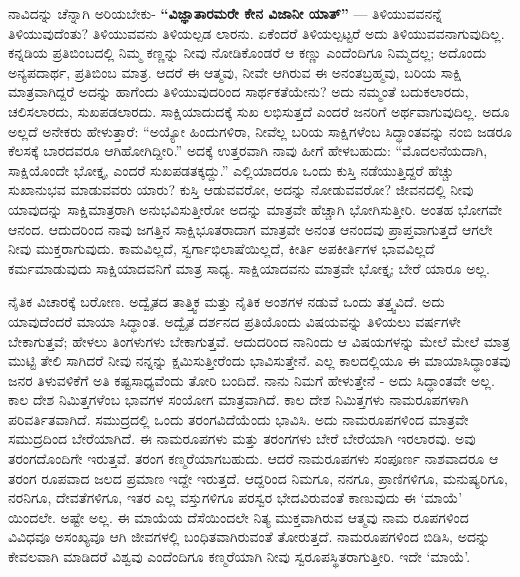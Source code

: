 ನಾವಿದನ್ನು ಚೆನ್ನಾಗಿ ಅರಿಯಬೇಕು- \textbf{“ವಿಜ್ಞಾತಾರಮರೇ ಕೇನ ವಿಜಾನೀ ಯಾತ್​”} — ತಿಳಿಯುವವನನ್ನೆ ತಿಳಿಯುವುದೆಂತು? ತಿಳಿಯುವವನು ತಿಳಿಯಲ್ಪಡ ಲಾರನು. ಏಕೆಂದರೆ ತಿಳಿಯಲ್ಪಟ್ಟರೆ ಅದು ತಿಳಿಯುವವನಾಗುವುದಿಲ್ಲ. ಕನ್ನಡಿಯ ಪ್ರತಿಬಿಂಬದಲ್ಲಿ ನಿಮ್ಮ ಕಣ್ಣನ್ನು ನೀವು ನೋಡಿಕೊಂಡರೆ ಆ ಕಣ್ಣು ಎಂದೆಂದಿಗೂ ನಿಮ್ಮದಲ್ಲ; ಅದೊಂದು ಅನ್ಯಪದಾರ್ಥ, ಪ್ರತಿಬಿಂಬ ಮಾತ್ರ. ಆದರೆ ಈ ಆತ್ಮವು, ನೀವೇ ಆಗಿರುವ ಈ ಅನಂತಬ್ರಹ್ಮವು, ಬರಿಯ ಸಾಕ್ಷಿ ಮಾತ್ರವಾಗಿದ್ದರೆ ಅದನ್ನು ಹಾಗೆಂದು ತಿಳಿಯುವುದರಿಂದ ಸಾರ್ಥಕತೆಯೇನು? ಅದು ನಮ್ಮಂತೆ ಬದುಕಲಾರದು, ಚಲಿಸಲಾರದು, ಸುಖಪಡಲಾರದು. ಸಾಕ್ಷಿಯಾದುದಕ್ಕೆ ಸುಖ ಲಭಿಸುತ್ತದೆ ಎಂದರೆ ಜನರಿಗೆ ಅರ್ಥವಾಗುವುದಿಲ್ಲ. ಅದೂ ಅಲ್ಲದೆ ಅನೇಕರು ಹೇಳುತ್ತಾರೆ: “ಅಯ್ಯೋ ಹಿಂದುಗಳಿರಾ, ನೀವೆಲ್ಲ ಬರಿಯ ಸಾಕ್ಷಿಗಳೆಂಬ ಸಿದ್ಧಾಂತವನ್ನು ನಂಬಿ ಜಡರೂ ಕೆಲಸಕ್ಕೆ ಬಾರದವರೂ ಆಗಿಹೋಗಿದ್ದೀರಿ.” ಅದಕ್ಕೆ ಉತ್ತರವಾಗಿ ನಾವು ಹೀಗೆ ಹೇಳಬಹುದು: “ಮೊದಲನೆಯದಾಗಿ, ಸಾಕ್ಷಿಯೊಂದೇ ಭೋಕ್ತೃ, ಎಂದರೆ ಸುಖಪಡತಕ್ಕದ್ದು.” ಎಲ್ಲಿಯಾದರೂ ಒಂದು ಕುಸ್ತಿ ನಡೆಯುತ್ತಿದ್ದರೆ ಹೆಚ್ಚು ಸುಖಾನುಭವ ಮಾಡುವವರು ಯಾರು? ಕುಸ್ತಿ ಆಡುವವರೋ, ಅದನ್ನು ನೋಡುವವರೋ? ಜೀವನದಲ್ಲಿ ನೀವು ಯಾವುದನ್ನು ಸಾಕ್ಷಿಮಾತ್ರರಾಗಿ ಅನುಭವಿಸುತ್ತೀರೋ ಅದನ್ನು ಮಾತ್ರವೇ ಹೆಚ್ಚಾಗಿ ಭೋಗಿಸುತ್ತೀರಿ. ಅಂತಹ ಭೋಗವೇ ಆನಂದ. ಆದುದರಿಂದ ನಾವು ಜಗತ್ತಿನ ಸಾಕ್ಷಿಭೂತರಾದಾಗ ಮಾತ್ರವೇ ಅನಂತ ಆನಂದವು ಪ್ರಾಪ್ತವಾಗುತ್ತದೆ ಆಗಲೇ ನೀವು ಮುಕ್ತರಾಗುವುದು. ಕಾಮವಿಲ್ಲದೆ, ಸ್ವರ್ಗಾಭಿಲಾಷೆಯಿಲ್ಲದೆ, ಕೀರ್ತಿ ಅಪಕೀರ್ತಿಗಳ ಭಾವವಿಲ್ಲದೆ ಕರ್ಮಮಾಡುವುದು ಸಾಕ್ಷಿಯಾದವನಿಗೆ ಮಾತ್ರ ಸಾಧ್ಯ. ಸಾಕ್ಷಿಯಾದವನು ಮಾತ್ರವೇ ಭೋಕ್ತೃ; ಬೇರೆ ಯಾರೂ ಅಲ್ಲ.

ನೈತಿಕ ವಿಚಾರಕ್ಕೆ ಬರೋಣ. ಅದ್ವೈತದ ತಾತ್ತ್ವಿಕ ಮತ್ತು ನೈತಿಕ ಅಂಶಗಳ ನಡುವೆ ಒಂದು ತತ್ತ್ವವಿದೆ. ಅದು ಯಾವುದೆಂದರೆ ಮಾಯಾ ಸಿದ್ಧಾಂತ. ಅದ್ವೈತ ದರ್ಶನದ ಪ್ರತಿಯೊಂದು ವಿಷಯವನ್ನು ತಿಳಿಯಲು ವರ್ಷಗಳೇ ಬೇಕಾಗುತ್ತವೆ; ಹೇಳಲು ತಿಂಗಳುಗಳು ಬೇಕಾಗುತ್ತವೆ. ಆದುದರಿಂದ ನಾನಿಂದು ಆ ವಿಷಯಗಳನ್ನು ಮೇಲೆ ಮೇಲೆ ಮಾತ್ರ ಮುಟ್ಟಿ ತೇಲಿ ಸಾಗಿದರೆ ನೀವು ನನ್ನನ್ನು ಕ್ಷಮಿಸುತ್ತೀರೆಂದು ಭಾವಿಸುತ್ತೇನೆ. ಎಲ್ಲ ಕಾಲದಲ್ಲಿಯೂ ಈ ಮಾಯಾಸಿದ್ಧಾಂತವು ಜನರ ತಿಳುವಳಿಕೆಗೆ ಅತಿ ಕಷ್ಟಸಾಧ್ಯವೆಂದು ತೋರಿ ಬಂದಿದೆ. ನಾನು ನಿಮಗೆ ಹೇಳುತ್ತೇನೆ - ಅದು ಸಿದ್ಧಾಂತವೇ ಅಲ್ಲ. ಕಾಲ ದೇಶ ನಿಮಿತ್ತಗಳೆಂಬ ಭಾವಗಳ ಸಂಯೋಗ ಮಾತ್ರವಾಗಿದೆ. ಕಾಲ ದೇಶ ನಿಮಿತ್ತಗಳು ನಾಮರೂಪಗಳಾಗಿ ಪರಿವರ್ತಿತವಾಗಿದೆ. ಸಮುದ್ರದಲ್ಲಿ ಒಂದು ತರಂಗವಿದೆಯೆಂದು ಭಾವಿಸಿ. ಅದು ನಾಮರೂಪಗಳಿಂದ ಮಾತ್ರವೇ ಸಮುದ್ರದಿಂದ ಬೇರೆಯಾಗಿದೆ. ಈ ನಾಮರೂಪಗಳು ಮತ್ತು ತರಂಗಗಳು ಬೇರೆ ಬೇರೆಯಾಗಿ ಇರಲಾರವು. ಅವು ತರಂಗದೊಂದಿಗೇ ಇರುತ್ತವೆ. ತರಂಗ ಕಣ್ಮರೆಯಾಗಬಹುದು. ಆದರೆ ನಾಮರೂಪಗಳು ಸಂಪೂರ್ಣ ನಾಶವಾದರೂ ಆ ತರಂಗ ರೂಪವಾದ ಜಲದ ಪ್ರಮಾಣ ಇದ್ದೇ ಇರುತ್ತದೆ. ಆದ್ದರಿಂದ ನಿಮಗೂ, ನನಗೂ, ಪ್ರಾಣಿಗಳಿಗೂ, ಮನುಷ್ಯರಿಗೂ, ನರನಿಗೂ, ದೇವತೆಗಳಿಗೂ, ಇತರ ಎಲ್ಲ ವಸ್ತುಗಳಿಗೂ ಪರಸ್ವರ ಭೇದವಿರುವಂತೆ ಕಾಣುವುದು ಈ ‘ಮಾಯೆ’ ಯಿಂದಲೇ. ಅಷ್ಟೇ ಅಲ್ಲ. ಈ ಮಾಯೆಯ ದೆಸೆಯಿಂದಲೇ ನಿತ್ಯ ಮುಕ್ತವಾಗಿರುವ ಆತ್ಮವು ನಾಮ ರೂಪಗಳಿಂದ ವಿವಿಧವೂ ಅಸಂಖ್ಯವೂ ಆಗಿ ಜೀವಗಳಲ್ಲಿ ಬಂಧಿತವಾಗಿರುವಂತೆ ತೋರುತ್ತದೆ. ನಾಮರೂಪಗಳಿಂದ ಬಿಡಿಸಿ, ಅದನ್ನು ಕೇವಲವಾಗಿ ಮಾಡಿದರೆ ವಿಶ್ವವು ಎಂದೆಂದಿಗೂ ಕಣ್ಮರೆಯಾಗಿ ನೀವು ಸ್ವರೂಪಸ್ಥಿತರಾಗುತ್ತೀರಿ. ಇದೇ ‘ಮಾಯೆ’.

